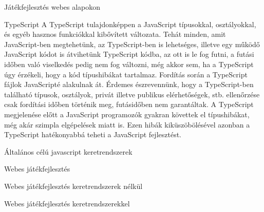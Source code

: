 \begin{MyChapter}{Játékfejlesztés webes alapokon}
	\begin{MySection}{TypeScript}
		A TypeScript tulajdonképpen a JavaScript típusokkal, osztályokkal, és egyéb hasznos funkciókkal kibővített változata. Tehát minden, amit JavaScript-ben megtehetünk, az TypeScript-ben is lehetséges, illetve egy működő JavaScript kódot is átvihetünk TypeScript kódba, az ott is le fog futni, a futási időben való viselkedés pedig nem fog változni, még akkor sem, ha a TypeScript úgy érzékeli, hogy a kód típushibákat tartalmaz. Fordítás során a TypeScript fájlok JavaScripté alakulnak át. Érdemes észrevennünk, hogy a TypeScript-ben található típusok, osztályok, privát illetve publikus elérhetőségek, stb. ellenőrzése csak fordítási időben történik meg, futásidőben nem garantáltak.
		A TypeScript megjelenése előtt a JavaScript programozók gyakran követtek el típushibákat, még akár szimpla elgépelések miatt is. Ezen hibák kiküszöbölésével azonban a TypeScript hatékonyabbá teheti a JavaScript fejlesztést.
		
	\end{MySection}

	\begin{MySection}{Általános célú javascript keretrendszerek}
	\end{MySection}

	\begin{MySection}{Webes játékfejlesztés}
	\end{MySection}

	\begin{MySection}{Webes játékfejlesztés keretrendszerek nélkül}
	\end{MySection}

	\begin{MySection}{Webes játékfejlesztés keretrendszerekkel}
	\end{MySection}
	
\end{MyChapter}